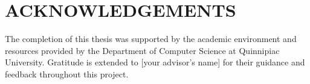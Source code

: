 %
%
%

\chapter*{ACKNOWLEDGEMENTS}


The completion of this thesis was supported by the academic environment
and resources provided by the Department of Computer Science at
Quinnipiac University. Gratitude is extended to [your advisor's name]
for their guidance and feedback throughout this project.

%
